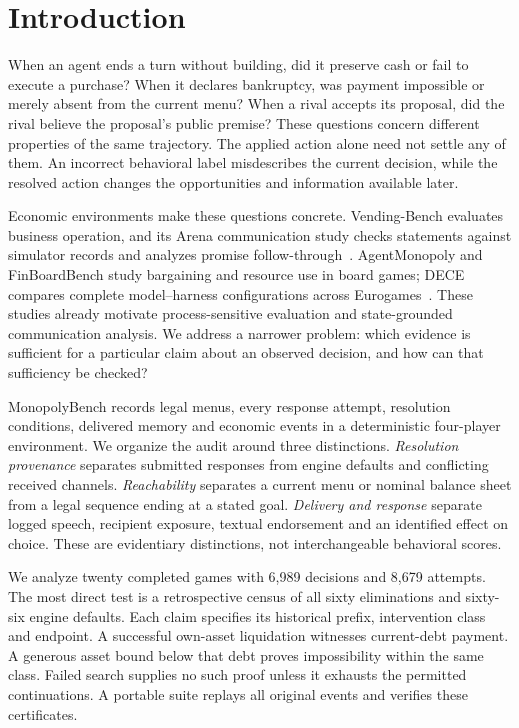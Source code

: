 \section{Introduction}

When an agent ends a turn without building, did it preserve cash or fail to execute a purchase? When it declares bankruptcy, was payment impossible or merely absent from the current menu? When a rival accepts its proposal, did the rival believe the proposal's public premise? These questions concern different properties of the same trajectory. The applied action alone need not settle any of them. An incorrect behavioral label misdescribes the current decision, while the resolved action changes the opportunities and information available later.

Economic environments make these questions concrete. Vending-Bench evaluates business operation, and its Arena communication study checks statements against simulator records and analyzes promise follow-through~\cite{backlund2025vendingbench,li2026arena}. AgentMonopoly and FinBoardBench study bargaining and resource use in board games; DECE compares complete model--harness configurations across Eurogames~\cite{wu2026agentmonopoly,hu2026finboardbench,zhang2026dece}. These studies already motivate process-sensitive evaluation and state-grounded communication analysis. We address a narrower problem: which evidence is sufficient for a particular claim about an observed decision, and how can that sufficiency be checked?

MonopolyBench records legal menus, every response attempt, resolution conditions, delivered memory and economic events in a deterministic four-player environment. We organize the audit around three distinctions. \emph{Resolution provenance} separates submitted responses from engine defaults and conflicting received channels. \emph{Reachability} separates a current menu or nominal balance sheet from a legal sequence ending at a stated goal. \emph{Delivery and response} separate logged speech, recipient exposure, textual endorsement and an identified effect on choice. These are evidentiary distinctions, not interchangeable behavioral scores.

We analyze twenty completed games with 6,989 decisions and 8,679 attempts. The most direct test is a retrospective census of all sixty eliminations and sixty-six engine defaults. Each claim specifies its historical prefix, intervention class and endpoint. A successful own-asset liquidation witnesses current-debt payment. A generous asset bound below that debt proves impossibility within the same class. Failed search supplies no such proof unless it exhausts the permitted continuations. A portable suite replays all original events and verifies these certificates.

